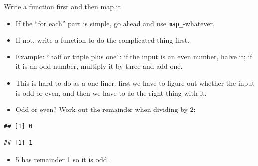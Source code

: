 \documentclass[ignorenonframetext,]{beamer}
\newenvironment{Shaded}{\begin{snugshade}}{\end{snugshade}}
\newcommand{\DecValTok}[1]{\textcolor[rgb]{0.00,0.00,0.81}{#1}}
\newcommand{\OperatorTok}[1]{\textcolor[rgb]{0.81,0.36,0.00}{\textbf{#1}}}
\newcommand{\StringTok}[1]{\textcolor[rgb]{0.31,0.60,0.02}{#1}}
\providecommand{\tightlist}{%
  \setlength{\itemsep}{0pt}\setlength{\parskip}{0pt}}
\begin{document}
\begin{frame}[fragile]{Write a function first and then map it}
\protect\hypertarget{write-a-function-first-and-then-map-it}{}

\begin{itemize}
\tightlist
\item
  If the ``for each'' part is simple, go ahead and use
  \texttt{map\_}-whatever.
\item
  If not, write a function to do the complicated thing first.
\item
  Example: ``half or triple plus one'': if the input is an even number,
  halve it; if it is an odd number, multiply it by three and add one.
\item
  This is hard to do as a one-liner: first we have to figure out whether
  the input is odd or even, and then we have to do the right thing with
  it.
\item
  Odd or even? Work out the remainder when dividing by 2:
\end{itemize}

\begin{Shaded}
\end{Shaded}

\begin{verbatim}
## [1] 0
\end{verbatim}

\begin{Shaded}
\end{Shaded}

\begin{verbatim}
## [1] 1
\end{verbatim}

\begin{itemize}
\tightlist
\item
  5 has remainder 1 so it is odd.
\end{itemize}

\end{frame}
\end{document}
